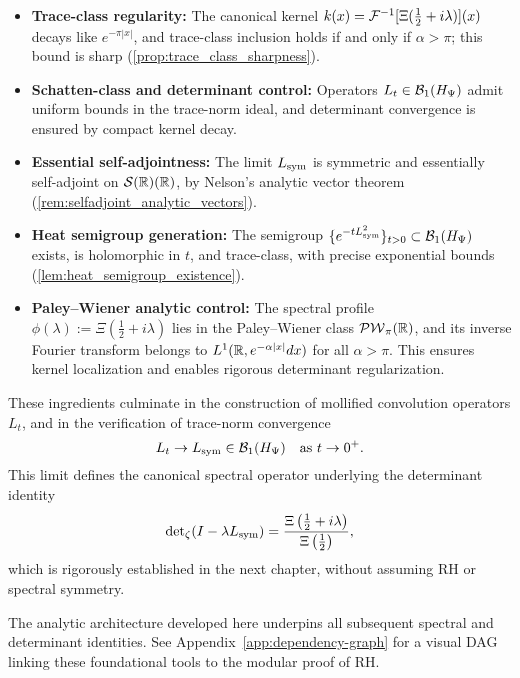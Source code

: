 \begin{itemize}
    \item \textbf{Trace-class regularity:} The canonical kernel \( k(x) = \mathcal{F}^{-1}[\Xi(\tfrac{1}{2} + i\lambda)](x) \) decays like \( e^{-\pi |x|} \), and trace-class inclusion holds if and only if \( \alpha > \pi \); this bound is sharp (\cref{prop:trace_class_sharpness}).

    \item \textbf{Schatten-class and determinant control:} Operators \( L_t \in \mathcal{B}_1(H_{\Psi}) \) admit uniform bounds in the trace-norm ideal, and determinant convergence is ensured by compact kernel decay.

    \item \textbf{Essential self-adjointness:} The limit \( L_{\mathrm{sym}} \) is symmetric and essentially self-adjoint on \( \mathcal{S}(\mathbb{R})(\mathbb{R}) \), by Nelson’s analytic vector theorem (\cref{rem:selfadjoint_analytic_vectors}).

    \item \textbf{Heat semigroup generation:} The semigroup \( \{e^{-t L_{\mathrm{sym}}^2}\}_{t > 0} \subset \mathcal{B}_1(H_{\Psi}) \) exists, is holomorphic in \( t \), and trace-class, with precise exponential bounds (\cref{lem:heat_semigroup_existence}).

    \item \textbf{Paley--Wiener analytic control:} The spectral profile \( \phi(\lambda) := \Xi(\tfrac{1}{2} + i\lambda) \) lies in the Paley--Wiener class \( \mathcal{PW}_{\pi}(\mathbb{R}) \), and its inverse Fourier transform belongs to \( L^1(\mathbb{R}, e^{-\alpha |x|} dx) \) for all \( \alpha > \pi \). This ensures kernel localization and enables rigorous determinant regularization.
\end{itemize}

These ingredients culminate in the construction of mollified convolution operators \( L_t \), and in the verification of trace-norm convergence
\[
L_t \to L_{\mathrm{sym}} \in \mathcal{B}_1(H_{\Psi}) \quad \text{as } t \to 0^+.
\]
This limit defines the canonical spectral operator underlying the determinant identity
\[
\det\nolimits_\zeta(I - \lambda L_{\mathrm{sym}}) = \frac{\Xi\left(\tfrac{1}{2} + i\lambda\right)}{\Xi\left(\tfrac{1}{2}\right)},
\]
which is rigorously established in the next chapter, without assuming RH or spectral symmetry.

\medskip

The analytic architecture developed here underpins all subsequent spectral and determinant identities.
See Appendix~\ref{app:dependency-graph} for a visual DAG linking these foundational tools to the modular proof of RH.
